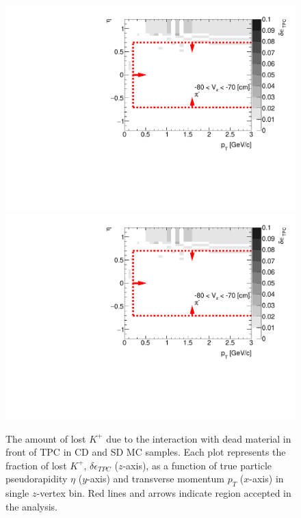 \begin{figure}[H]
	\caption[The amount of lost $K^+$ due to the interaction with dead material in front of TPC as a function of $p_T$, $\eta$ and $z$-vertex in CD and SD]{The amount of lost $K^+$ due to the interaction with dead material in front of TPC in CD and SD MC samples. Each plot represents the fraction of lost $K^+$, $\delta\epsilon_{ TPC}$ ($z$-axis), as a function of true particle pseudorapidity $\eta$ ($y$-axis) and transverse momentum $p_{T}$ ($x$-axis) in single $z$-vertex bin. Red lines and arrows indicate region accepted in the analysis.}\label{fig:dead_materialCDSD3DKp}
	\parbox{0.325\textwidth}{
		\includegraphics[width=\linewidth,page=65]{graphics/systematicsEfficiency/deadMaterial/secondaries_Unbinned_SDCD_.pdf}\\
		\includegraphics[width=\linewidth,page=68]{graphics/systematicsEfficiency/deadMaterial/secondaries_Unbinned_SDCD_.pdf}\\
}
\end{figure}
